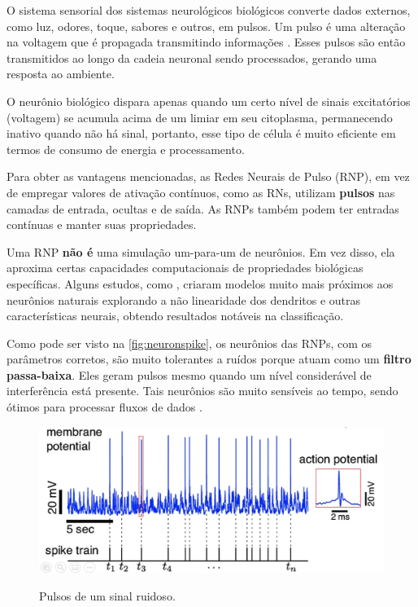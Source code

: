 			\par O sistema sensorial dos sistemas neurológicos biológicos converte dados externos, como luz, odores, toque, sabores e outros, em pulsos. Um pulso é uma alteração na voltagem que é propagada transmitindo informações \cite{kasabov2019time}. Esses pulsos são então transmitidos ao longo da cadeia neuronal sendo processados, gerando uma resposta ao ambiente.
			
			\par O neurônio biológico dispara apenas quando um certo nível de sinais excitatórios (voltagem) se acumula acima de um limiar em seu citoplasma, permanecendo inativo quando não há sinal, portanto, esse tipo de célula é muito eficiente em termos de consumo de energia e processamento.
			
			\par Para obter as vantagens mencionadas, as Redes Neurais de Pulso (RNP), em vez de empregar valores de ativação contínuos, como as RNs, utilizam \textbf{pulsos} nas camadas de entrada, ocultas e de saída. As RNPs também podem ter entradas contínuas e manter suas propriedades.
			
			\par Uma RNP \textbf{não é} uma simulação um-para-um de neurônios. Em vez disso, ela aproxima certas capacidades computacionais de propriedades biológicas específicas. Alguns estudos, como \cite{jones2020single}, criaram modelos muito mais próximos aos neurônios naturais explorando a não linearidade dos dendritos e outras características neurais, obtendo resultados notáveis na classificação.
			
			\par Como pode ser visto na  \autoref{fig:neuronspike}, os neurônios das RNPs, com os parâmetros corretos, são muito tolerantes a ruídos porque atuam como um \textbf{filtro passa-baixa}. Eles geram pulsos mesmo quando um nível considerável de interferência está presente. Tais neurônios são muito sensíveis ao tempo, sendo ótimos para processar fluxos de dados \cite{10242251}.
			
			\begin{figure}[H]
				\centering
				\caption{Pulsos de um sinal ruidoso.}
				\includegraphics[width=0.7\linewidth]{images/neuronSpikes}
				\label{fig:neuronspike}
			\end{figure}
				
